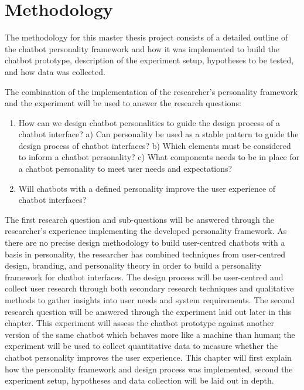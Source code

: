 \chapter{Methodology}
\label{chap:methodology}

The methodology for this master thesis project consists of a detailed outline of the chatbot personality framework and how it was implemented to build the chatbot prototype, description of the experiment setup, hypotheses to be tested, and how data was collected.

The combination of the implementation of the researcher's personality framework and the experiment will be used to answer the research questions:

\begin{enumerate}
    \item How can we design chatbot personalities to guide the design process of a chatbot interface? 
        \subitem a) Can personality be used as a stable pattern to guide the design \subitem    process of chatbot interfaces?
        \subitem b) Which elements must be considered to inform a chatbot personality?
        \subitem c) What components needs to be in place for a chatbot personality to \subitem  meet user needs and expectations?
    \item Will chatbots with a defined personality improve the user experience of chatbot interfaces?
\end{enumerate}

The first research question and sub-questions will be answered through the researcher's experience implementing the developed personality framework. As there are no precise design methodology to build user-centred chatbots with a basis in personality, the researcher has combined techniques from user-centred design, branding, and personality theory in order to build a personality framework for chatbot interfaces. The design process will be user-centred and collect user research through both secondary research techniques and qualitative methods to gather insights into user needs and system requirements. The second research question will be answered through the experiment laid out later in this chapter. This experiment will assess the chatbot prototype against another version of the same chatbot which behaves more like a machine than human; the experiment will be used to collect quantitative data to measure whether the chatbot personality improves the user experience. This chapter will first explain how the personality framework and design process was implemented, second  the experiment setup, hypotheses and data collection will be laid out in depth.

